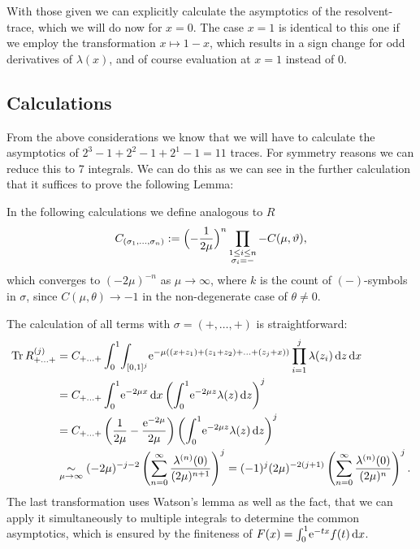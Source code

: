 With those given we can explicitly calculate the asymptotics of the
resolvent-trace, which we will do now for $x=0$. The case $x=1$ is identical to
this one if we employ the transformation $x\mapsto 1-x$, which results in a sign
change for odd derivatives of $\lambda(x)$, and of course evaluation at $x=1$
instead of $0$.

\subsection{Calculations}
From the above considerations we know that we will have to calculate the
asymptotics of $2^3 - 1 + 2^2 - 1 + 2^1 - 1 = 11$ traces. For symmetry reasons
we can reduce this to 7 integrals. We can do this as we can see in the further
calculation that it suffices to prove the following Lemma:

In the following calculations we define analogous to $R$
\begin{align}
  C_{(\sigma_1,\ldots,\sigma_n)} := \Bigl(-\frac{1}{2\mu}\Bigr)^n
                                    \prod_{
                                      \substack{
                                        1\le i \le n \\
                                        \sigma_i = -
                                    }} -C(\mu,\theta),
\end{align}
which converges to $(-2\mu)^{-n}$ as $\mu\to\infty$, where $k$ is the count
of $(-)$-symbols in $\sigma$, since $C(\mu,\theta)\to -1$ in the non-degenerate
case of $\theta \neq 0$.

The calculation of all terms with $\sigma=(+,\ldots,+)$ is straightforward:
\begin{align*}
  \Tr R^{(j)}_{+\ldots+} &=
    C_{+\ldots+}
    \Int{x}{
      \Integ{[0,1]^{j}}{z}{
        \Eto{-\mu((x + z_1) + (z_1 + z_2) + \ldots + (z_j + x))}
        \prod_{i=1}^j \lambda(z_i)
      }
    } \\
    &= C_{+\ldots+}
      \Int{x}{\Eto{-2\mu x}} \left(\Int{z}{\Eto{-2\mu z}\lambda(z)}\right)^j \\
    &= C_{+\ldots+}
      \left(\frac1{2\mu} - \frac{\Eto{-2\mu}}{2\mu}\right)
      \left(\Int{z}{\Eto{-2\mu z}\lambda(z)}\right)^j \\
      &\SimMu (-2\mu)^{-j-2}
      \left(\Wsum{\lambda^{(n)}}\right)^j = (-1)^j (2\mu)^{-2(j+1)}
      \left(\sum_{n=0}^\infty\frac{\lambda^{(n)}(0)}{(2\mu)^n}\right)^j.
\end{align*}
The last transformation uses Watson's lemma as well as the fact, that we can
apply it simultaneously to multiple integrals to determine the common
asymptotics, which is ensured by the finiteness of $F(x) =
\Int{x}{\Eto{-tx}f(t)}$. %

